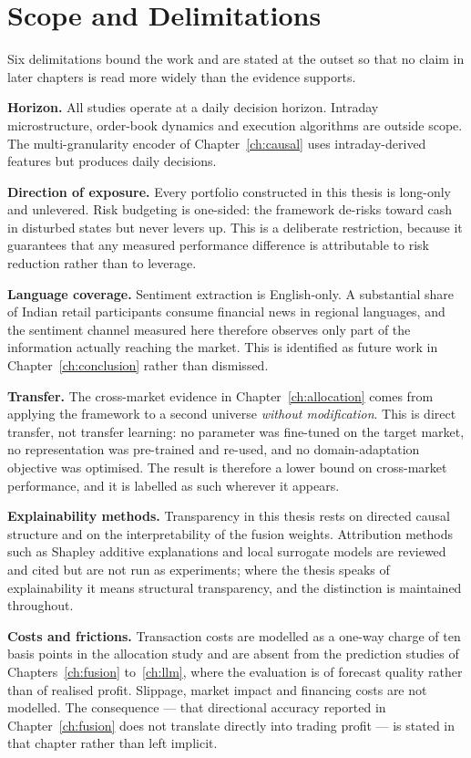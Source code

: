 \section{Scope and Delimitations}

Six delimitations bound the work and are stated at the outset so that no claim in later
chapters is read more widely than the evidence supports.

\textbf{Horizon.} All studies operate at a daily decision horizon. Intraday microstructure,
order-book dynamics and execution algorithms are outside scope. The multi-granularity encoder
of Chapter~\ref{ch:causal} uses intraday-derived features but produces daily decisions.

\textbf{Direction of exposure.} Every portfolio constructed in this thesis is long-only and
unlevered. Risk budgeting is one-sided: the framework de-risks toward cash in disturbed states
but never levers up. This is a deliberate restriction, because it guarantees that any measured
performance difference is attributable to risk reduction rather than to leverage.

\textbf{Language coverage.} Sentiment extraction is English-only. A substantial share of Indian
retail participants consume financial news in regional languages, and the sentiment channel
measured here therefore observes only part of the information actually reaching the market.
This is identified as future work in Chapter~\ref{ch:conclusion} rather than dismissed.

\textbf{Transfer.} The cross-market evidence in Chapter~\ref{ch:allocation} comes from applying
the framework to a second universe \emph{without modification}. This is direct transfer, not
transfer learning: no parameter was fine-tuned on the target market, no representation was
pre-trained and re-used, and no domain-adaptation objective was optimised. The result is
therefore a lower bound on cross-market performance, and it is labelled as such wherever it
appears.

\textbf{Explainability methods.} Transparency in this thesis rests on directed causal structure
and on the interpretability of the fusion weights. Attribution methods such as Shapley additive
explanations and local surrogate models are reviewed and cited but are not run as experiments;
where the thesis speaks of explainability it means structural transparency, and the distinction
is maintained throughout.

\textbf{Costs and frictions.} Transaction costs are modelled as a one-way charge of ten basis
points in the allocation study and are absent from the prediction studies of
Chapters~\ref{ch:fusion} to~\ref{ch:llm}, where the evaluation is of forecast quality rather
than of realised profit. Slippage, market impact and financing costs are not modelled. The
consequence --- that directional accuracy reported in Chapter~\ref{ch:fusion} does not
translate directly into trading profit --- is stated in that chapter rather than left implicit.

